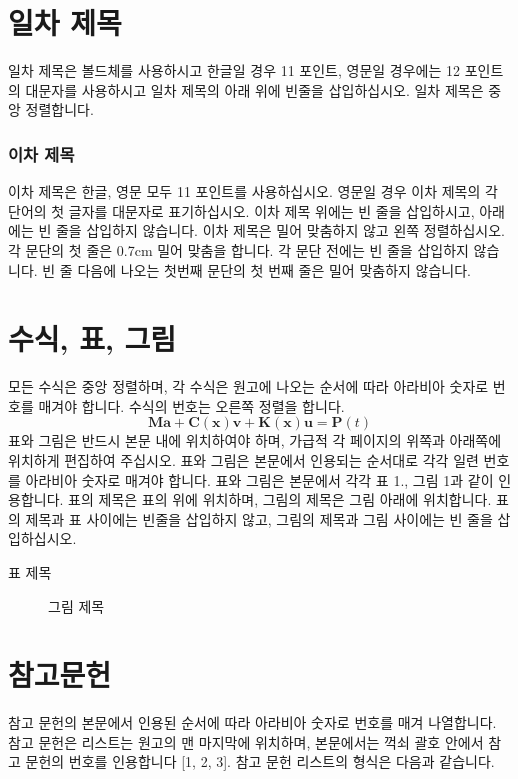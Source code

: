 \documentclass[11pt]{ksiamproc_h}
\begin{document}
\section*{일차 제목}\noindent%
일차 제목은 볼드체를 사용하시고 한글일 경우 11 포인트, 영문일
경우에는 12 포인트의 대문자를 사용하시고 일차 제목의 아래 위에
빈줄을 삽입하십시오. 일차 제목은 중앙 정렬합니다.
\subsubsection*{이차 제목}
이차 제목은 한글, 영문 모두 11 포인트를 사용하십시오. 영문일 경우
이차 제목의 각 단어의 첫 글자를 대문자로 표기하십시오. 이차 제목
위에는 빈 줄을 삽입하시고, 아래에는 빈 줄을 삽입하지 않습니다. 이차
제목은 밀어 맞춤하지 않고 왼쪽 정렬하십시오. 각 문단의 첫 줄은 0.7cm
밀어 맞춤을 합니다. 각 문단 전에는 빈 줄을 삽입하지 않습니다. 빈 줄
다음에 나오는 첫번째 문단의 첫 번째 줄은 밀어 맞춤하지 않습니다.
\section*{수식, 표, 그림}\noindent%
모든 수식은 중앙 정렬하며, 각 수식은 원고에 나오는 순서에 따라
아라비아 숫자로 번호를 매겨야 합니다.  수식의 번호는 오른쪽 정렬을
합니다.
\begin{equation}\label{eq:1}
\mathbf{Ma}+\mathbf{C(x)v}+\mathbf{K(x)u}=\mathbf{P}(t)
\end{equation}
표와 그림은 반드시 본문 내에 위치하여야 하며, 가급적
각 페이지의 위쪽과 아래쪽에 위치하게 편집하여 주십시오.
 표와 그림은 본문에서 인용되는 순서대로 각각 일련 번호를 아라비아
 숫자로 매겨야 합니다.  표와 그림은 본문에서 각각 표 1.,
 그림 1과 같이 인용합니다.  표의 제목은 표의 위에 위치하며, 그림의 제목은 그림
 아래에 위치합니다.  표의 제목과 표 사이에는 빈줄을 삽입하지 않고,
 그림의 제목과 그림 사이에는 빈 줄을 삽입하십시오.

\begin{table}[ht]
\caption{표 제목}
\end{table}
\noindent{}

\begin{figure}[ht]
\caption{\label{fig:p6} 그림 제목}
\end{figure}


\section*{참고문헌}\noindent%
참고 문헌의 본문에서 인용된 순서에 따라 아라비아 숫자로 번호를 매겨 나열합니다.
 참고 문헌은 리스트는 원고의 맨 마지막에 위치하며,
 본문에서는 꺽쇠 괄호 안에서 참고 문헌의 번호를 인용합니다 [1, 2, 3].
 참고 문헌 리스트의 형식은 다음과 같습니다.
\\
\end{document}
